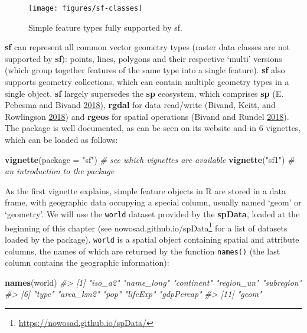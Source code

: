 \documentclass[]{krantz}
\newenvironment{Shaded}{\begin{snugshade}}{\end{snugshade}}
\newcommand{\CommentTok}[1]{\textcolor[rgb]{0.37,0.37,0.37}{\textit{#1}}}
\newcommand{\DataTypeTok}[1]{\textcolor[rgb]{0.27,0.27,0.27}{#1}}
\newcommand{\KeywordTok}[1]{\textcolor[rgb]{0.27,0.27,0.27}{\textbf{#1}}}
\newcommand{\NormalTok}[1]{#1}
\newcommand{\StringTok}[1]{\textcolor[rgb]{0.5,0.5,0.5}{#1}}
\let\rmarkdownfootnote\footnote%
\def\footnote{\protect\rmarkdownfootnote}
\renewcommand{\href}[2]{#2\footnote{\url{#1}}}
\begin{document}
\begin{figure}[t]

{\centering \texttt{[image: figures/sf-classes]} 

}

\caption{Simple feature types fully supported by sf.}\label{fig:sf-ogc}
\end{figure}

\textbf{sf} can represent all common vector geometry types (raster data classes are not supported by \textbf{sf}): points, lines, polygons and their respective `multi' versions (which group together features of the same type into a single feature).
\textbf{sf} also supports geometry collections, which can contain multiple geometry types in a single object.
\textbf{sf} largely supersedes the \textbf{sp} ecosystem, which comprises \textbf{sp} (E. Pebesma and Bivand \protect\hyperlink{ref-R-sp}{2018}), \textbf{rgdal} for data read/write (Bivand, Keitt, and Rowlingson \protect\hyperlink{ref-R-rgdal}{2018}) and \textbf{rgeos} for spatial operations (Bivand and Rundel \protect\hyperlink{ref-R-rgeos}{2018}).
The package is well documented, as can be seen on its website and in 6 vignettes, which can be loaded as follows:

\begin{Shaded}
\begin{Highlighting}[]
\KeywordTok{vignette}\NormalTok{(}\DataTypeTok{package =} \StringTok{"sf"}\NormalTok{) }\CommentTok{# see which vignettes are available}
\KeywordTok{vignette}\NormalTok{(}\StringTok{"sf1"}\NormalTok{)          }\CommentTok{# an introduction to the package}
\end{Highlighting}
\end{Shaded}

As the first vignette explains, simple feature objects in R are stored in a data frame, with geographic data occupying a special column, usually named `geom' or `geometry'.
We will use the \texttt{world} dataset provided by the \textbf{spData}, loaded at the beginning of this chapter (see \href{https://nowosad.github.io/spData/}{nowosad.github.io/spData} for a list of datasets loaded by the package).
\texttt{world} is a spatial object containing spatial and attribute columns, the names of which are returned by the function \texttt{names()} (the last column contains the geographic information):

\begin{Shaded}
\begin{Highlighting}[]
\KeywordTok{names}\NormalTok{(world)}
\CommentTok{#>  [1] "iso_a2"    "name_long" "continent" "region_un" "subregion"}
\CommentTok{#>  [6] "type"      "area_km2"  "pop"       "lifeExp"   "gdpPercap"}
\CommentTok{#> [11] "geom"}
\end{Highlighting}
\end{Shaded}
\end{document}
